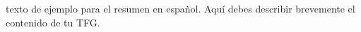 texto de ejemplo para el resumen en español. Aquí debes describir brevemente el contenido de tu TFG.